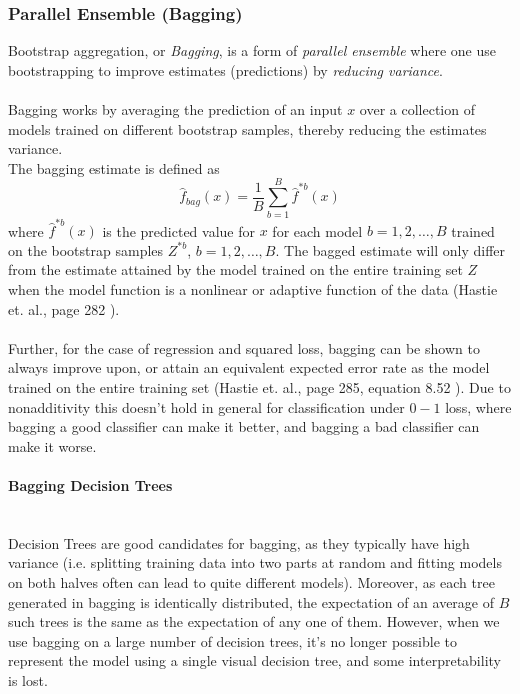 \documentclass[10pt, a4paper, twocolumn]{article}
\newcommand{\myparagraph}[1]{\paragraph{#1}\mbox{}\\}
\begin{document}
			\subsubsection{Parallel Ensemble (Bagging)}
				Bootstrap aggregation, or \emph{Bagging}, is a form of \emph{parallel ensemble } where one use bootstrapping to improve estimates (predictions) by \emph{reducing variance}.\\\\	
				Bagging works by averaging the prediction of an input $x$ over a collection of models trained on different bootstrap samples, thereby reducing the estimates variance.\\
				The bagging estimate is defined as 
					$$\hat{f}_{bag}(x)=\frac{1}{B}\sum_{b=1}^B\hat{f}^{*b}(x)$$ 
				where $\hat{f}^{*b}(x)$ is the predicted value for $x$ for each model $b=1,2,\dots,B$ trained on the bootstrap samples $Z^{*b}$, $b=1,2,\dots,B$. The bagged estimate will only differ from the estimate attained by the model trained on the entire training set $Z$ when the model function is a nonlinear or adaptive function of the data (Hastie et. al., page 282 \cite{ElementsOfStatLearning}).\\\\
				Further, for the case of regression and squared loss, bagging can be shown to always improve upon, or attain an equivalent expected error rate as the model trained on the entire training set (Hastie et. al., page 285, equation 8.52 \cite{ElementsOfStatLearning}). Due to nonadditivity this doesn't hold in general for classification under $0-1$ loss, where bagging a good classifier can make it better, and bagging a bad classifier can make it worse. 
				\myparagraph{Bagging Decision Trees}
					Decision Trees are good candidates for bagging, as they typically have high variance (i.e. splitting training data into two parts at random and fitting models on both halves often can lead to quite different models). Moreover, as each tree generated in bagging is identically distributed, the expectation of an average of $B$ such trees is the same as the expectation of any one of them. However, when we use bagging on a large number of decision trees, it's no longer possible to represent the model using a single visual decision tree, and some interpretability is lost.
				
\end{document}
